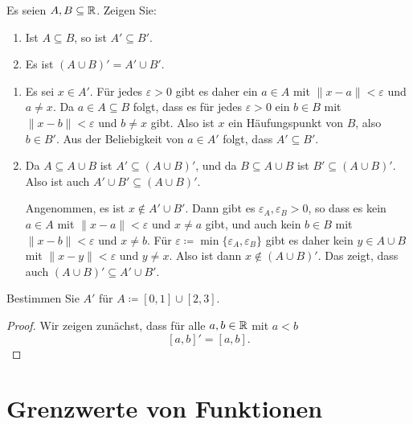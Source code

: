 \documentclass[a4paper,10pt]{article}
\begin{document}
\begin{question}
 Es seien $A, B \subseteq \mathbb{R}$. Zeigen Sie:
 \begin{enumerate}
  \item
   Ist $A \subseteq B$, so ist $A' \subseteq B'$.
  \item
   Es ist $(A \cup B)' = A' \cup B'$.
 \end{enumerate}
\end{question}
\begin{solution}
 \begin{enumerate}
  \item
   Es sei $x \in A'$. Für jedes $\varepsilon > 0$ gibt es daher ein $a \in A$ mit $\|x-a\| < \varepsilon$ und $a \neq x$. Da $a \in A \subseteq B$ folgt, dass es für jedes $\varepsilon > 0$ ein $b \in B$ mit $\|x-b\| < \varepsilon$ und $b \neq x$ gibt. Also ist $x$ ein Häufungspunkt von $B$, also $b \in B'$. Aus der Beliebigkeit von $a \in A'$ folgt, dass $A' \subseteq B'$.
  \item
   Da $A \subseteq A \cup B$ ist $A' \subseteq (A \cup B)'$, und da $B \subseteq A \cup B$ ist $B' \subseteq (A \cup B)'$. Also ist auch $A' \cup B' \subseteq (A \cup B)'$.
   
   Angenommen, es ist $x \notin A' \cup B'$. Dann gibt es $\varepsilon_A, \varepsilon_B > 0$, so dass es kein $a \in A$ mit $\|x-a\| < \varepsilon$ und $x \neq a$ gibt, und auch kein $b \in B$ mit $\|x-b\| < \varepsilon$ und $x \neq b$. Für $\varepsilon \coloneqq \min\{\varepsilon_A, \varepsilon_B\}$ gibt es daher kein $y \in A \cup B$ mit $\|x-y\| < \varepsilon$ und $y \neq x$. Also ist dann $x \notin (A \cup B)'$. Das zeigt, dass auch $(A \cup B)' \subseteq A' \cup B'$.
  \qedhere
 \end{enumerate}
\end{solution}


\begin{question}
 Bestimmen Sie $A'$ für $A \coloneqq [0,1] \cup [2,3]$.
\end{question}
\begin{proof}
 Wir zeigen zunächst, dass für alle $a,b \in \mathbb{R}$ mit $a<b$
 \[
  [a,b]' = [a,b].
 \]
\end{proof}






\section{Grenzwerte von Funktionen}
\end{document}

